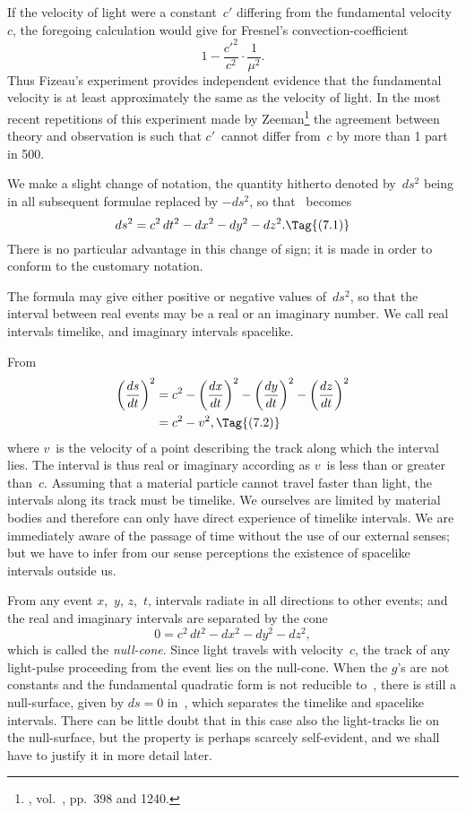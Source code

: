 \documentclass[12pt]{book}
\begin{document}
If the velocity of light  were a constant~$c'$ differing from the
fundamental velocity~$c$, the foregoing calculation would give for Fresnel's
convection-coefficient
\[
1 - \frac{c'^{2}}{c^{2}} \cdot \frac{1}{\mu^{2}}.
\]
Thus Fizeau's experiment provides independent evidence that the fundamental
%
velocity is at least approximately the same as the velocity of light. In the most
recent repetitions of this experiment made by Zeeman\footnote
  {, vol.~, pp.~398 and 1240.}
the agreement between
theory and observation is such that $c'$~cannot differ from~$c$ by more than 1 part in 500.

%
%

We make a slight change of notation, the quantity hitherto denoted by~$ds^{2}$
being in all subsequent formulae replaced by $-ds^{2}$, so that ~becomes
\[
ds^{2} = c^{2}\, dt^{2} - dx^{2} - dy^{2} - dz^{2}.
\Tag{(7.1)}
\]
There is no particular advantage in this change of sign; it is made in order
to conform to the customary notation.

The formula may give either positive or negative values of~$ds^{2}$, so that the
interval between real events may be a real or an imaginary number. We call
real intervals timelike, and imaginary intervals spacelike.

From 
\begin{align*}
  \left(\frac{ds}{dt}\right)^{2}
  &= c^{2} - \left(\frac{dx}{dt}\right)^{2} - \left(\frac{dy}{dt}\right)^{2} - \left(\frac{dz}{dt}\right)^{2} \\
  &= c^{2} - v^{2},
  \Tag{(7.2)}
\end{align*}
where $v$~is the velocity of a point describing the track along which the interval
lies. The interval is thus real or imaginary according as $v$~is less than or
greater than~$c$. Assuming that a material particle cannot travel faster than
light, the intervals along its track must be timelike. We ourselves are limited
by material bodies and therefore can only have direct experience of timelike
intervals. We are immediately aware of the passage of time without the use
of our external senses; but we have to infer from our sense perceptions the
existence of spacelike intervals outside us.

From any event $x$,~$y$, $z$,~$t$, intervals radiate in all directions to other events;
and the real and imaginary intervals are separated by the cone
\[
0 = c^{2}\, dt^{2} - dx^{2} - dy^{2} - dz^{2},
\]
which is called the \emph{null-cone}. Since light travels with velocity~$c$, the track of
%
any light-pulse proceeding from the event lies on the null-cone. When the
$g$'s are not constants and the fundamental quadratic form is not reducible to~,
there is still a null-surface, given by $ds = 0$ in~, which separates the
timelike and spacelike intervals. There can be little doubt that in this case
also the light-tracks lie on the null-surface, but the property is perhaps scarcely
self-evident, and we shall have to justify it in more detail later.
\end{document}
